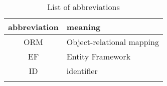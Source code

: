 
\begin{table}[h!]
    \centering

    \begin{tabular}{cl}
        \toprule
        abbreviation & meaning                        \\
        \midrule
        ORM     & Object-relational mapping           \\
        EF      & Entity Framework                    \\
        ID      & identifier                          \\
                &                                     \\
        \bottomrule
    \end{tabular}

    \caption{List of abbreviations}

\end{table}